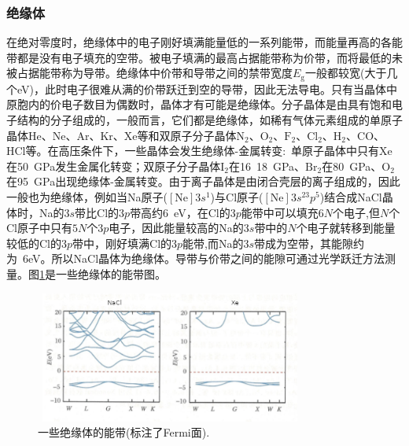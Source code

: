 \subsubsection{绝缘体}
在绝对零度时，绝缘体中的电子刚好填满能量低的一系列能带，而能量再高的各能带都是没有电子填充的空带。被电子填满的最高占据能带称为价带，而将最低的未被占据能带称为导带。绝缘体中价带和导带之间的禁带宽度$E_\mathrm{g}$一般都较宽(大于几个eV)，此时电子很难从满的价带跃迁到空的导带，因此无法导电。只有当晶体中原胞内的价电子数目为偶数时，晶体才有可能是绝缘体。分子晶体是由具有饱和电子结构的分子组成的，一般而言，它们都是绝缘体，如稀有气体元素组成的单原子晶体He、Ne、Ar、Kr、Xe等和双原子分子晶体$\mathrm{N}_2$、$\mathrm{O}_2$、$\mathrm{F}_2$、$\mathrm{Cl}_2$、$\mathrm{H}_2$、CO、HCl等。在高压条件下，一些晶体会发生绝缘体-金属转变:~单原子晶体中只有Xe在50~GPa发生金属化转变；双原子分子晶体$\mathrm{I}_2$在16~18~GPa、$\mathrm{Br}_2$在80~GPa、$\mathrm{O}_2$在95~GPa出现绝缘体-金属转变。由于离子晶体是由闭合壳层的离子组成的，因此一般也为绝缘体，例如当Na原子($[\mathrm{Ne}]3s^1$)与Cl原子($[\mathrm{Ne}]3s^23p^5$)结合成NaCl晶体时，Na的$3s$带比Cl的$3p$带高约6~eV，在Cl的$3p$能带中可以填充$6N$个电子,但$N$个Cl原子中只有$5N$个$3p$电子，因此能量较高的Na的$3s$带中的$N$个电子就转移到能量较低的Cl的$3p$带中，刚好填满Cl的$3p$能带,而Na的$3s$带成为空带，其能隙约为~6eV。所以NaCl晶体为绝缘体。导带与价带之间的能隙可通过光学跃迁方法测量。图\ref{Fig:Band_structure-insulator}是一些绝缘体的能带图。
\begin{figure}[h!]
\centering
\vspace*{-0.10in}
\includegraphics[height=1.70in,width=3.50in,viewport=0 0 95 47,clip]{Figures/Band_Structure-insulator.png}
\caption{\small \textrm{一些绝缘体的能带(标注了Fermi面).}}%
\label{Fig:Band_structure-insulator}
\end{figure}

